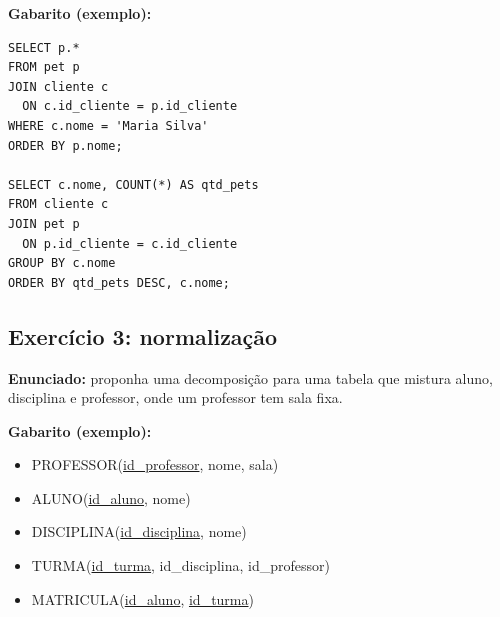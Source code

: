 \documentclass[12pt,a4paper]{article}
\begin{document}
\textbf{Gabarito (exemplo):}
\begin{lstlisting}[style=sql]
SELECT p.*
FROM pet p
JOIN cliente c
  ON c.id_cliente = p.id_cliente
WHERE c.nome = 'Maria Silva'
ORDER BY p.nome;

SELECT c.nome, COUNT(*) AS qtd_pets
FROM cliente c
JOIN pet p
  ON p.id_cliente = c.id_cliente
GROUP BY c.nome
ORDER BY qtd_pets DESC, c.nome;
\end{lstlisting}

\subsection{Exercício 3: normalização}
\textbf{Enunciado:} proponha uma decomposição para uma tabela que mistura aluno, disciplina e professor, onde um professor tem sala fixa.

\textbf{Gabarito (exemplo):}
\begin{itemize}[leftmargin=*,itemsep=0.2em]
  \item PROFESSOR(\underline{id\_professor}, nome, sala)
  \item ALUNO(\underline{id\_aluno}, nome)
  \item DISCIPLINA(\underline{id\_disciplina}, nome)
  \item TURMA(\underline{id\_turma}, id\_disciplina, id\_professor)
  \item MATRICULA(\underline{id\_aluno}, \underline{id\_turma})
\end{itemize}
\end{document}
